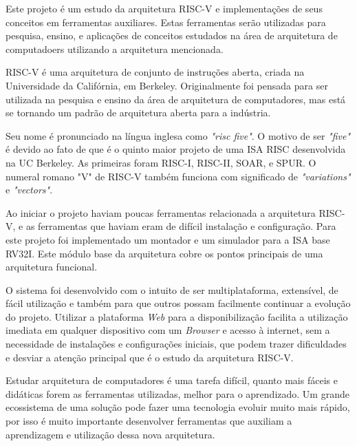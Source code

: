 

Este projeto é um estudo da arquitetura RISC-V e implementações de seus conceitos em ferramentas auxiliares. Estas ferramentas serão utilizadas para pesquisa, ensino, e aplicações de conceitos estudados na área de arquitetura de computadoers utilizando a arquitetura mencionada.

RISC-V é uma arquitetura de conjunto de instruções aberta, criada na Universidade da Califórnia, em Berkeley. Originalmente foi pensada para ser utilizada na pesquisa e ensino da área de arquitetura de computadores, mas está se tornando um padrão de arquitetura aberta para a indústria.~\cite{riscv_spec}

Seu nome é pronunciado na língua inglesa como \textit{"risc five"}. O motivo de ser \textit{"five"} é devido ao fato de que é o quinto maior projeto de uma ISA RISC desenvolvida na UC Berkeley. As primeiras foram RISC-I, RISC-II, SOAR, e SPUR. O numeral romano "V" de RISC-V também funciona com significado de \textit{"variations"} e \textit{"vectors"}.

Ao iniciar o projeto haviam poucas ferramentas relacionada a arquitetura RISC-V, e as ferramentas que haviam eram de difícil instalação e configuração. Para este projeto foi implementado um montador e um simulador para a ISA base RV32I. Este módulo base da arquitetura cobre os pontos principais de uma arquitetura funcional. 

O sistema foi desenvolvido com o intuito de ser multiplataforma, extensível, de fácil utilização e também para que outros possam facilmente continuar a evolução do projeto. Utilizar a plataforma \textit{Web} para a disponibilização facilita a utilização imediata em qualquer dispositivo com um \textit{Browser} e acesso à internet, sem a necessidade de instalações e configurações iniciais, que podem trazer dificuldades e desviar a atenção principal que é o estudo da arquitetura RISC-V. 

Estudar arquitetura de computadores é uma tarefa difícil, quanto mais fáceis e didáticas forem as ferramentas utilizadas, melhor para o aprendizado. Um grande ecossistema de uma solução pode fazer uma tecnologia evoluir muito mais rápido, por isso é muito importante desenvolver ferramentas que auxiliam a aprendizagem e utilização dessa nova arquitetura.


